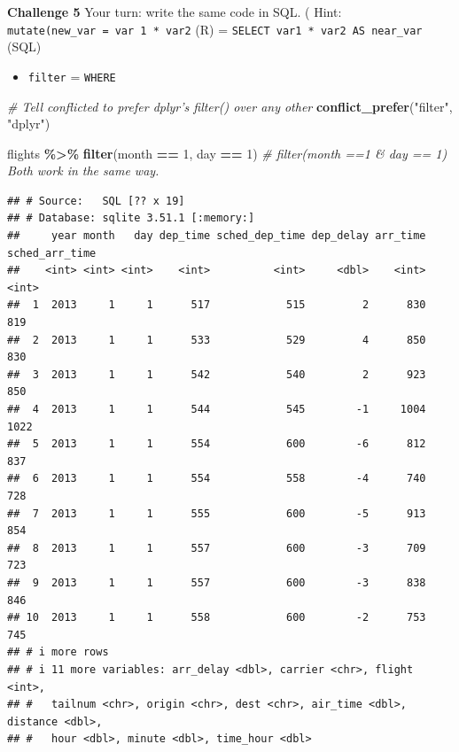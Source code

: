 \documentclass[
]{book}
\newenvironment{Shaded}{\begin{snugshade}}{\end{snugshade}}
\newcommand{\CommentTok}[1]{\textcolor[rgb]{0.56,0.35,0.01}{\textit{#1}}}
\newcommand{\DecValTok}[1]{\textcolor[rgb]{0.00,0.00,0.81}{#1}}
\newcommand{\FunctionTok}[1]{\textcolor[rgb]{0.13,0.29,0.53}{\textbf{#1}}}
\newcommand{\NormalTok}[1]{#1}
\newcommand{\SpecialCharTok}[1]{\textcolor[rgb]{0.81,0.36,0.00}{\textbf{#1}}}
\newcommand{\StringTok}[1]{\textcolor[rgb]{0.31,0.60,0.02}{#1}}
\providecommand{\tightlist}{%
  \setlength{\itemsep}{0pt}\setlength{\parskip}{0pt}}
\begin{document}
\textbf{Challenge 5}
Your turn: write the same code in SQL. (
Hint: \texttt{mutate(new\_var\ =\ var\ 1\ *\ var2} (R) = \texttt{SELECT\ var1\ *\ var2\ AS\ near\_var} (SQL)

\begin{itemize}
\tightlist
\item
  \texttt{filter} = \texttt{WHERE}
\end{itemize}

\begin{Shaded}
\begin{Highlighting}[]
\CommentTok{\# Tell conflicted to prefer dplyr’s filter() over any other}
\FunctionTok{conflict\_prefer}\NormalTok{(}\StringTok{"filter"}\NormalTok{, }\StringTok{"dplyr"}\NormalTok{)}

\NormalTok{flights }\SpecialCharTok{\%\textgreater{}\%} 
  \FunctionTok{filter}\NormalTok{(month }\SpecialCharTok{==} \DecValTok{1}\NormalTok{, day }\SpecialCharTok{==} \DecValTok{1}\NormalTok{) }\CommentTok{\# filter(month ==1 \& day == 1) Both work in the same way.}
\end{Highlighting}
\end{Shaded}

\begin{verbatim}
## # Source:   SQL [?? x 19]
## # Database: sqlite 3.51.1 [:memory:]
##     year month   day dep_time sched_dep_time dep_delay arr_time sched_arr_time
##    <int> <int> <int>    <int>          <int>     <dbl>    <int>          <int>
##  1  2013     1     1      517            515         2      830            819
##  2  2013     1     1      533            529         4      850            830
##  3  2013     1     1      542            540         2      923            850
##  4  2013     1     1      544            545        -1     1004           1022
##  5  2013     1     1      554            600        -6      812            837
##  6  2013     1     1      554            558        -4      740            728
##  7  2013     1     1      555            600        -5      913            854
##  8  2013     1     1      557            600        -3      709            723
##  9  2013     1     1      557            600        -3      838            846
## 10  2013     1     1      558            600        -2      753            745
## # i more rows
## # i 11 more variables: arr_delay <dbl>, carrier <chr>, flight <int>,
## #   tailnum <chr>, origin <chr>, dest <chr>, air_time <dbl>, distance <dbl>,
## #   hour <dbl>, minute <dbl>, time_hour <dbl>
\end{verbatim}
\end{document}
